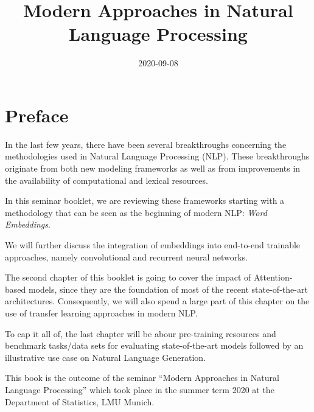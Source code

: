 \documentclass[]{krantz}
\title{Modern Approaches in Natural Language Processing}
\author{}
\date{\vspace{-2.5em}2020-09-08}
\begin{document}
\maketitle


\thispagestyle{empty}

\begin{center}
\end{center}

\setlength{\abovedisplayskip}{-5pt}
\setlength{\abovedisplayshortskip}{-5pt}

{
\hypersetup{linkcolor=}
\setcounter{tocdepth}{0}
\tableofcontents
}
\hypertarget{preface}{%
\chapter*{Preface}\label{preface}}


In the last few years, there have been several breakthroughs concerning the methodologies used in Natural Language Processing (NLP). These breakthroughs originate from both new modeling frameworks as well as from improvements in the availability of computational and lexical resources.

In this seminar booklet, we are reviewing these frameworks starting with a methodology that can be seen as the beginning of modern NLP: \emph{Word Embeddings}.

We will further discuss the integration of embeddings into end-to-end trainable approaches, namely convolutional and recurrent neural networks.

The second chapter of this booklet is going to cover the impact of Attention-based models, since they are the foundation of most of the recent state-of-the-art architectures. Consequently, we will also spend a large part of this chapter on the use of transfer learning approaches in modern NLP.

To cap it all of, the last chapter will be abour pre-training resources and benchmark tasks/data sets for evaluating state-of-the-art models followed by an illustrative use case on Natural Language Generation.

This book is the outcome of the seminar ``Modern Approaches in Natural Language Processing'' which took place in the summer term 2020 at the Department of Statistics, LMU Munich.
\end{document}
